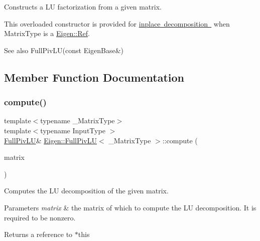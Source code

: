 Constructs a LU factorization from a given matrix. 

This overloaded constructor is provided for \mbox{\hyperlink{}{inplace decomposition }} when {\ttfamily Matrix\+Type} is a \mbox{\hyperlink{class_eigen_1_1_ref}{Eigen\+::\+Ref}}.

\begin{DoxySeeAlso}{See also}
Full\+Piv\+L\+U(const Eigen\+Base\&) 
\end{DoxySeeAlso}


\subsection{Member Function Documentation}
\mbox{\label{class_eigen_1_1_full_piv_l_u_a0a3c3b1bbafa31a03567a4573ebabc79}} 
\subsubsection{\texorpdfstring{compute()}{compute()}}
{\footnotesize\ttfamily template$<$typename \+\_\+\+Matrix\+Type$>$ \\
template$<$typename Input\+Type $>$ \\
\mbox{\hyperlink{class_eigen_1_1_full_piv_l_u}{Full\+Piv\+LU}}\& \mbox{\hyperlink{class_eigen_1_1_full_piv_l_u}{Eigen\+::\+Full\+Piv\+LU}}$<$ \+\_\+\+Matrix\+Type $>$\+::compute (\begin{DoxyParamCaption}\item[{const \mbox{\hyperlink{struct_eigen_1_1_eigen_base}{Eigen\+Base}}$<$ Input\+Type $>$ \&}]{matrix }\end{DoxyParamCaption})\hspace{0.3cm}{\ttfamily [inline]}}

Computes the LU decomposition of the given matrix.


\begin{DoxyParams}{Parameters}
{\em matrix} & the matrix of which to compute the LU decomposition. It is required to be nonzero.\\
\hline
\end{DoxyParams}
\begin{DoxyReturn}{Returns}
a reference to $\ast$this 
\end{DoxyReturn}
\mbox{\label{class_eigen_1_1_full_piv_l_u_a71654e5c60a26407ecccfaa5b34bb0aa}} 
